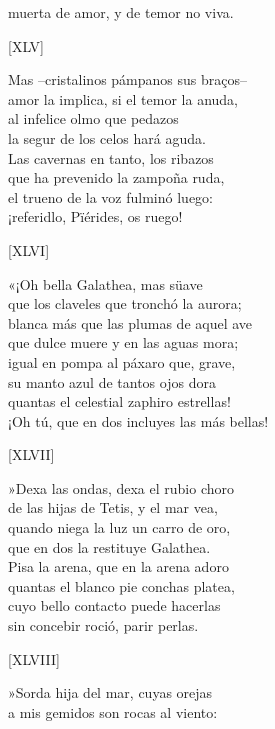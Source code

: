 \documentclass[11pt,a4paper,twoside]{article}
\begin{document}
muerta de amor, y de temor no viva.\par\pend
%
\begin{center}
	[XLV]
\end{center}\pstart
Mas --cristalinos pámpanos sus braços--\\
amor la implica, si el temor la anuda,\\
al infelice olmo que pedazos\\
la segur de los celos hará aguda.\\
Las cavernas en tanto, los ribazos\\
que ha prevenido la zampoña ruda,\\
el trueno de la voz fulminó luego:\\
¡referidlo, Pïérides, os ruego!\par\pend
%
\begin{center}
	[XLVI]
\end{center}\pstart
«¡Oh bella Galathea, mas süave\\
que los claveles que tronchó la aurora;\\
blanca más que las plumas de aquel ave\\
que dulce muere y en las aguas mora;\\
igual en pompa al páxaro que, grave,\\
su manto azul de tantos ojos dora\\
quantas el celestial zaphiro estrellas!\\
¡Oh tú, que en dos incluyes las más bellas!\par\pend
%
\begin{center}
	[XLVII]
\end{center}\pstart
»Dexa las ondas, dexa el rubio choro\\
de las hijas de Tetis, y el mar vea,\\
quando niega la luz un carro de oro,\\
que en dos la restituye Galathea.\\
Pisa la arena, que en la arena adoro\\
quantas el blanco pie conchas platea,\\
cuyo bello contacto puede hacerlas\\
sin concebir roció, parir perlas.\par\pend
%
\begin{center}
	[XLVIII]
\end{center}\pstart
»Sorda hija del mar, cuyas orejas\\
a mis gemidos son rocas al viento:\\
\end{document}
